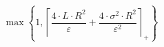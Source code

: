 \[\max\left\{ 1, \left\lceil \frac{4 \cdot L \cdot R^{2}}{\varepsilon} + \frac{4 \cdot \sigma^{2} \cdot R^{2}}{\varepsilon^{2}} \right\rceil_{+} \right\}\]
